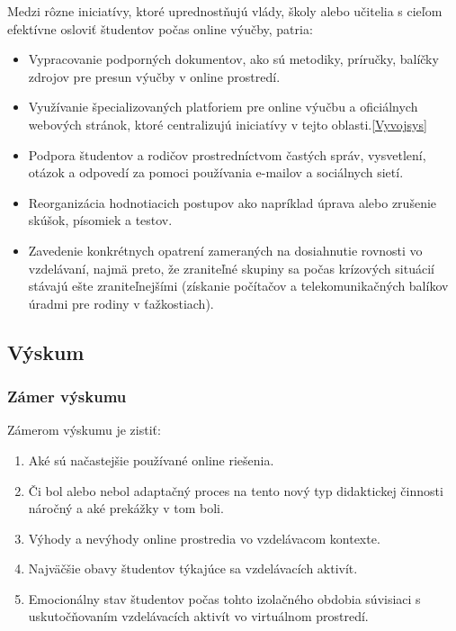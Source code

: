 \documentclass[10pt,oneside,slovak,a4paper]{article}
\begin{document}
Medzi rôzne iniciatívy, ktoré uprednostňujú vlády, školy alebo učitelia s cieľom efektívne osloviť študentov počas online výučby, patria:
\begin{itemize}
	\item Vypracovanie podporných dokumentov, ako sú metodiky, príručky, balíčky zdrojov pre presun výučby v online prostredí.
	\item Využívanie špecializovaných platforiem pre online výučbu  a oficiálnych webových stránok, ktoré centralizujú iniciatívy v tejto oblasti.\ref{Vyvojsys}%
	\item Podpora študentov a rodičov prostredníctvom častých správ, vysvetlení, otázok a odpovedí za pomoci používania e-mailov a sociálnych sietí.
	\item Reorganizácia hodnotiacich postupov ako napríklad úprava alebo zrušenie skúšok, písomiek a testov.
	\item Zavedenie konkrétnych opatrení zameraných na dosiahnutie rovnosti vo vzdelávaní, najmä preto, že zraniteľné skupiny sa počas krízových situácií stávajú ešte zraniteľnejšími (získanie počítačov a telekomunikačných balíkov úradmi pre rodiny v ťažkostiach).
\end{itemize}

\subsection{Výskum}%
\subsubsection{Zámer výskumu}
Zámerom výskumu je zistiť\cite{covid19}:
\begin{enumerate}
	\item Aké sú načastejšie používané online riešenia.
	\item Či bol alebo nebol adaptačný proces na tento nový typ didaktickej činnosti náročný a aké prekážky v tom boli.
	\item Výhody a nevýhody online prostredia vo vzdelávacom kontexte.
	\item Najväčšie obavy študentov týkajúce sa vzdelávacích aktivít. %
	\item Emocionálny stav študentov počas tohto izolačného obdobia súvisiaci s uskutočňovaním vzdelávacích aktivít vo virtuálnom prostredí.
\end{enumerate}
\end{document}
